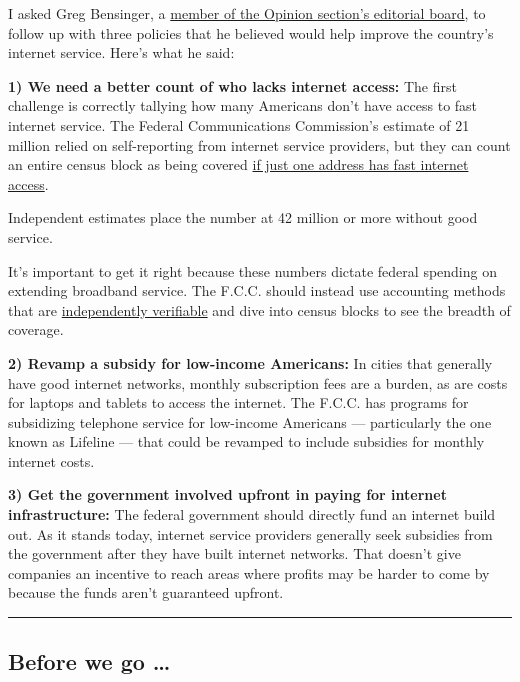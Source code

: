 I asked Greg Bensinger, a
\href{https://www.nytimes3xbfgragh.onion/interactive/2018/opinion/editorialboard.html}{member
of the Opinion section's editorial board}, to follow up with three
policies that he believed would help improve the country's internet
service. Here's what he said:

\textbf{1) We need a better count of who lacks internet access:} The
first challenge is correctly tallying how many Americans don't have
access to fast internet service. The Federal Communications Commission's
estimate of 21 million relied on self-reporting from internet service
providers, but they can count an entire census block as being covered
\href{https://www.nytimes3xbfgragh.onion/2020/05/05/technology/rural-america-digital-divide-coronavirus.html}{if
just one address has fast internet access}.

Independent estimates place the number at 42 million or more without
good service.

It's important to get it right because these numbers dictate federal
spending on extending broadband service. The F.C.C. should instead use
accounting methods that are
\href{https://broadbandnow.com/research/fcc-underestimates-unserved-by-50-percent}{independently
verifiable} and dive into census blocks to see the breadth of coverage.

\textbf{2) Revamp a subsidy for low-income Americans:} In cities that
generally have good internet networks, monthly subscription fees are a
burden, as are costs for laptops and tablets to access the internet. The
F.C.C. has programs for subsidizing telephone service for low-income
Americans --- particularly the one known as Lifeline --- that could be
revamped to include subsidies for monthly internet costs.

\textbf{3) Get the government involved upfront in paying for internet
infrastructure:} The federal government should directly fund an internet
build out. As it stands today, internet service providers generally seek
subsidies from the government after they have built internet networks.
That doesn't give companies an incentive to reach areas where profits
may be harder to come by because the funds aren't guaranteed upfront.

\begin{center}\rule{0.5\linewidth}{\linethickness}\end{center}

\hypertarget{before-we-go-}{%
\subsection{Before we go \ldots{}}\label{before-we-go-}}

